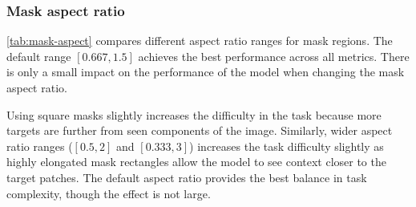 \subsubsection{Mask aspect ratio}

\cref{tab:mask-aspect} compares different aspect ratio ranges for mask regions.
The default range $[0.667, 1.5]$ achieves the best performance across all metrics.
There is only a small impact on the performance of the model when changing the mask aspect ratio.

Using square masks slightly increases the difficulty in the task because more targets are further from seen components of the image.
Similarly, wider aspect ratio ranges ($[0.5, 2]$ and $[0.333, 3]$) increases the task difficulty slightly as highly elongated mask rectangles allow the model to see context closer to the target patches.
The default aspect ratio provides the best balance in task complexity, though the effect is not large.

\begin{table}[tbh]
\centering
\caption{Effect of mask aspect ratio range. The default aspect ratio (highlighted) allows moderate variation; $[1,\,1]$ constrains masks to be square. ViT-S, $K{=}4$, 300 ep. on IN-1k. Although the mask scale parameter is held constant, the seen rate varies due to changes in the distribution of possible mask areas for a given aspect ratio range.}
\label{tab:mask-aspect}
\small
{}
\end{table}








